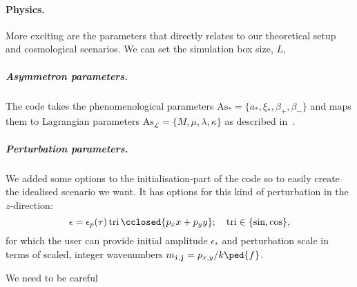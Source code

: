
    
    \paragraph{Physics.} %
    More exciting are the parameters that directly relates to our theoretical setup and cosmological scenarios. We can set the simulation box size, $L$, 
        \subparagraph{Asymmetron parameters.} %
        The code takes the phenomenological parameters $\mathrm{As}_\ast = \{a_\ast, \xi_\ast, \beta_+, \beta_- \}$ and maps them to Lagrangian parameters $\mathrm{As}_\mathcal{L} = \{ M, \mu, \lambda, \kappa \}$ as described in~.


        \subparagraph{Perturbation parameters.} %
        We added some options to the initialisation-part of the code so to easily create the idealised scenario we want. It has options for this kind of perturbation in the $z$-direction:
        \begin{equation}
            \epsilon = \epsilon_p(\tau) \mathop{\mathrm{tri}}{\cclosed{ p_x x + p_y y }}; \quad \mathop{\mathrm{tri}} \in \{ \sin, \cos \},
        \end{equation}
        for which the user can provide initial amplitude $\epsilon_\ast$ and perturbation scale in terms of scaled, integer wavenumbers $m_{\lcoord{i},\lcoord{j}} = p_{x,y} /k\ped{f}$. 
        
    We need to be careful \blahblah








